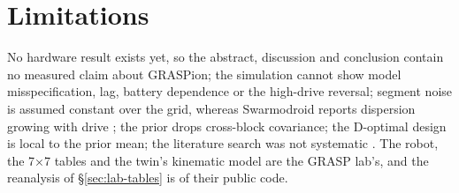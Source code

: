 \section{Limitations}\label{sec:limitations}

 No hardware result exists yet, so
the abstract, discussion and conclusion contain no measured claim about
GRASPion; the simulation cannot
show model misspecification, lag, battery dependence or the high-drive
reversal; segment noise is assumed constant over the grid, whereas
Swarmodroid reports dispersion growing with drive
\cite{dmitriev2023swarmodroid}; the prior drops cross-block covariance;
the D-optimal design is local to the prior mean; the literature search
was not systematic . The robot, the 7×7 tables
and the twin's kinematic model are the GRASP lab's, and the reanalysis
of §\ref{sec:lab-tables} is of their public code.
